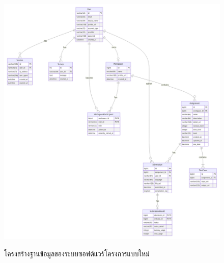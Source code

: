 \documentclass[12pt,one side,openright,a4paper]{cpe-thesis-th}
\begin{document}
% 


\begin{figure}[H]
    \centering
        \includegraphics[width=15cm]{figure/diagram/database-v4.png}
    \label{fig:appendix-database}
    \caption[โครงสร้างฐานข้อมูลของระบบซอฟต์แวร์โครงการแบบใหม่]{โครงสร้างฐานข้อมูลของระบบซอฟต์แวร์โครงการแบบใหม่}
\end{figure}

\centering{} \\
\end{document}
